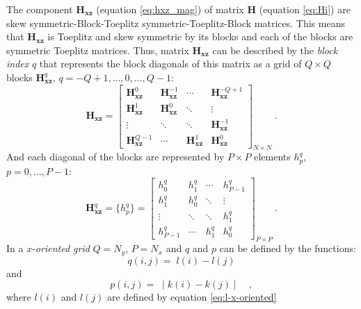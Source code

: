 The component $\mathbf{H_{xz}}$ (equation \ref{eq:hxz_mag}) of matrix $\mathbf{H}$ (equation \ref{eq:Hi}) are skew symmetric-Block-Toeplitz symmetric-Toeplitz-Block matrices. This means that $\mathbf{H_{xz}}$ is Toeplitz and skew symmetric by its blocks and each of the blocks are symmetric Toeplitz matrices. 
Thus, matrix $\mathbf{H_{xz}}$ can be described by the \textit{block index} $q$ that represents the block diagonals of this matrix as a grid of $Q \times Q$ blocks $\mathbf{H}^{q}_\mathbf{xz}$, $q = -Q + 1, \dots, 0, \dots, Q - 1$:
\begin{equation}
\mathbf{H_{xz}} = \begin{bmatrix}
\mathbf{H}^{0}_\mathbf{xz}  & \mathbf{H}^{-1}_\mathbf{xz} & \cdots         & \mathbf{H}^{-Q+1}_\mathbf{xz} \\
\mathbf{H}^{1}_\mathbf{xz}  & \mathbf{H}^{0}_\mathbf{xz} & \ddots         & \vdots           \\ 
\vdots           & \ddots         & \ddots         & \mathbf{H}^{-1}_\mathbf{xz}   \\
\mathbf{H}^{Q-1}_\mathbf{xz} & \cdots         & \mathbf{H}^{1}_\mathbf{xz} & \mathbf{H}^{0}_\mathbf{xz}                
\end{bmatrix}_{N \times N} \: .
\label{eq:BTTB_Hxz}
\end{equation}
And each diagonal of the blocks are represented by $P \times P$ elements $h^{q}_{p}$, $p = 0, \dots, P - 1$:
\begin{equation}
\mathbf{H}^{q}_\mathbf{xz} =  \{h^{q}_p\} = \begin{bmatrix}
h^{q}_{0}   & h^{q}_{1} & \cdots    & h^{q}_{P-1} \\
h^{q}_{1}   & h^{q}_{0} & \ddots    & \vdots           \\ 
\vdots      & \ddots    & \ddots    & h^{q}_{1}   \\
h^{q}_{P-1} & \cdots    & h^{q}_{1} & h^{q}_{0}                 
\end{bmatrix}_{P \times P} \: .
\label{eq:Hxz_block}
\end{equation}
In a $x$-\textit{oriented grid} $Q = N_{y}$, $P = N_{x}$ and $q$ and $p$ can be defined by the functions:
\begin{equation}
q(i, j) = \; l(i) - l(j) 
\label{eq:Hxz-q-x-oriented}
\end{equation}
and
\begin{equation}
p(i, j) = \; \mid k(i) - k(j) \mid \quad ,
\label{eq:Hxz-p-x-oriented}
\end{equation}
where $l(i)$ and $l(j)$ are defined by equation \ref{eq:l-x-oriented} 
